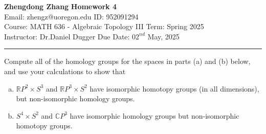 \documentclass[a4paper, 12pt]{article}
\begin{document}
\noindent

\large\textbf{Zhengdong Zhang} \hfill \textbf{Homework 4} \\
Email: zhengz@uoregon.edu \hfill ID: 952091294 \\
\normalsize Course: MATH 636 - Algebraic Topology III \hfill Term: Spring 2025 \\
Instructor: Dr.Daniel Dugger \hfill Due Date: $02^{nd}$ May, 2025 \\ 
\noindent\rule{7in}{2.8pt}

\begin{problem}{1}
Compute all of the homology groups for the spaces in parts (a) and (b) below, and use your calculations to show that 
\begin{enumerate}[(a)]
\item \(\mathbb{R}P^2\times S^3\) and \(\mathbb{R}P^3\times S^2\) have isomorphic homotopy groups (in all dimensions), but non-isomorphic homology groups. 
\item \(S^4\times S^2\) and \(\mathbb{C}P^3\) have isomorphic homology groups but non-isomorphic homotopy groups. 
\end{enumerate}
\end{problem}
\end{document}
